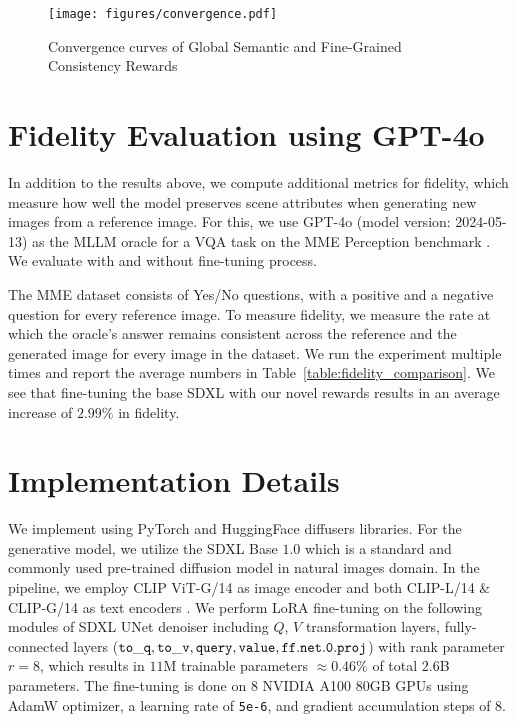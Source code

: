 \begin{figure}[!h]
    \centering
    \texttt{[image: figures/convergence.pdf]}
    \caption{Convergence curves of Global Semantic and Fine-Grained Consistency Rewards}
    \label{fig:convergence}
\end{figure}


\section{Fidelity Evaluation using GPT-4o}
In addition to the results above, we compute additional metrics for fidelity, which measure how well the model preserves scene attributes when generating new images from a reference image. For this, we use GPT-4o (model version: 2024-05-13) as the MLLM oracle for a VQA task on the MME Perception benchmark \citep{fu2024mme}. 
We evaluate \method with and without fine-tuning process.

The MME dataset consists of Yes/No questions, with a positive and a negative question for every reference image. To measure fidelity, we measure the rate at which the oracle's answer remains consistent across the reference and the generated image for every image in the dataset. We run the experiment multiple times and report the average numbers in Table~\ref{table:fidelity_comparison}. We see that fine-tuning the base SDXL with our novel rewards results in an average increase of $2.99\%$ in fidelity.




\section{Implementation Details}
\label{appendix:impl}
We implement \method using PyTorch \citep{paszke2019pytorch} and HuggingFace diffusers \citep{huggingface2023diffusers} libraries. For the generative model, we utilize the SDXL Base $1.0$ which is a standard and commonly used pre-trained diffusion model in natural images domain. In the pipeline, we employ CLIP ViT-G/14 as image encoder and both CLIP-L/14 \& CLIP-G/14 as text encoders \citep{radford2021learning}. We perform LoRA fine-tuning on the following modules of SDXL UNet denoiser including $Q$, $V$ transformation layers, fully-connected layers ($\tt{to\_q, to\_v, query, value, ff.net.0.proj}$) with rank parameter $r = 8$, which results in $11$M trainable parameters $\approx 0.46\%$ of total $2.6$B parameters. The fine-tuning is done on $8$ NVIDIA A100 80GB GPUs using AdamW \citep{loshchilov2017decoupled} optimizer, a learning rate of \texttt{5e-6}, and gradient accumulation steps of $8$.

